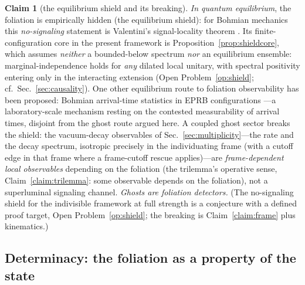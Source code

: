 \documentclass[11pt]{article}
\theoremstyle{definition}
\newtheorem{claim}[theorem]{Claim}
\theoremstyle{remark}
\begin{document}
\begin{claim}[the equilibrium shield and its breaking]
\label{claim:shield}
\emph{In quantum equilibrium}, the foliation is empirically hidden
(the equilibrium shield): for Bohmian mechanics this
\emph{no-signaling} statement is Valentini's signal-locality theorem
\cite{Valentini1991}. Its finite-configuration core in the present
framework is Proposition~\ref{prop:shieldcore}, which assumes
\emph{neither} a bounded-below spectrum \emph{nor} an equilibrium
ensemble: marginal-independence holds for \emph{any} dilated local
unitary, with spectral positivity entering only in the interacting
extension (Open Problem~\ref{op:shield}; cf.\
Sec.~\ref{sec:causality}). One other equilibrium route to
foliation observability has been proposed: Bohmian arrival-time
statistics in EPRB configurations \cite{AmblardDrezet}---a
laboratory-scale mechanism resting on the contested measurability
of arrival times, disjoint from the ghost route argued here. A coupled ghost sector breaks the
shield: the vacuum-decay observables of
Sec.~\ref{sec:multiplicity}---the rate and the decay spectrum,
isotropic precisely in the individuating frame (with a cutoff edge in
that frame where a frame-cutoff rescue applies)---are
\emph{frame-dependent local observables} depending on the foliation
(the trilemma's operative sense, Claim~\ref{claim:trilemma}: some
observable depends on the foliation), not a superluminal signaling
channel. \emph{Ghosts are foliation detectors.} (The no-signaling
shield for the indivisible framework at full strength is a conjecture
with a defined proof target, Open Problem~\ref{op:shield}; the
breaking is Claim~\ref{claim:frame} plus kinematics.)
\end{claim}

\subsection{Determinacy: the foliation as a property of the state}
\end{document}

